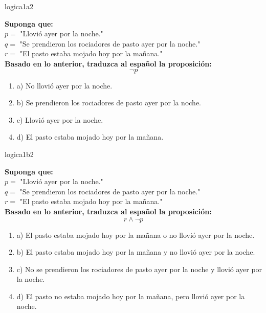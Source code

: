 \documentclass{article}
\begin{document}
\begin{question}{3}{logica}{1}{a}{2}{
\textbf{Suponga que:}\\
\(p =\) "Llovió ayer por la noche."\\
\(q =\) "Se prendieron los rociadores de pasto ayer por la noche."\\
\(r =\) "El pasto estaba mojado hoy por la mañana."\\
\textbf{Basado en lo anterior, traduzca al español la proposición:}\\
$$\neg p$$

\begin{enumerate}
    \item a) No llovió ayer por la noche.
    \item b) Se prendieron los rociadores de pasto ayer por la noche.
    \item c) Llovió ayer por la noche.
    \item d) El pasto estaba mojado hoy por la mañana.
\end{enumerate}
}
\end{question}

\begin{question}{4}{logica}{1}{b}{2}{
\textbf{Suponga que:}\\
\(p =\) "Llovió ayer por la noche."\\
\(q =\) "Se prendieron los rociadores de pasto ayer por la noche."\\
\(r =\) "El pasto estaba mojado hoy por la mañana."\\
\textbf{Basado en lo anterior, traduzca al español la proposición:}\\
$$
r \land \neg p
$$

\begin{enumerate}
    \item a) El pasto estaba mojado hoy por la mañana o no llovió ayer por la noche.
    \item b) El pasto estaba mojado hoy por la mañana y no llovió ayer por la noche.
    \item c) No se prendieron los rociadores de pasto ayer por la noche y llovió ayer por la noche.
    \item d) El pasto no estaba mojado hoy por la mañana, pero llovió ayer por la noche.
\end{enumerate}
}
\end{question}
\end{document}
